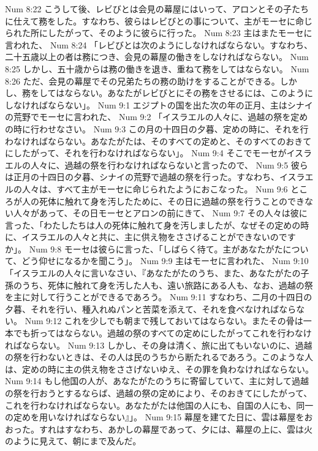 Num 8:22  こうして後、レビびとは会見の幕屋にはいって、アロンとその子たちに仕えて務をした。すなわち、彼らはレビびとの事について、主がモーセに命じられた所にしたがって、そのように彼らに行った。
Num 8:23  主はまたモーセに言われた、
Num 8:24  「レビびとは次のようにしなければならない。すなわち、二十五歳以上の者は務につき、会見の幕屋の働きをしなければならない。
Num 8:25  しかし、五十歳からは務の働きを退き、重ねて務をしてはならない。
Num 8:26  ただ、会見の幕屋でその兄弟たちの務の助けをすることができる。しかし、務をしてはならない。あなたがレビびとにその務をさせるには、このようにしなければならない」。
Num 9:1  エジプトの国を出た次の年の正月、主はシナイの荒野でモーセに言われた、
Num 9:2  「イスラエルの人々に、過越の祭を定めの時に行わせなさい。
Num 9:3  この月の十四日の夕暮、定めの時に、それを行わなければならない。あなたがたは、そのすべての定めと、そのすべてのおきてにしたがって、それを行わなければならない」。
Num 9:4  そこでモーセがイスラエルの人々に、過越の祭を行わなければならないと言ったので、
Num 9:5  彼らは正月の十四日の夕暮、シナイの荒野で過越の祭を行った。すなわち、イスラエルの人々は、すべて主がモーセに命じられたようにおこなった。
Num 9:6  ところが人の死体に触れて身を汚したために、その日に過越の祭を行うことのできない人々があって、その日モーセとアロンの前にきて、
Num 9:7  その人々は彼に言った、「わたしたちは人の死体に触れて身を汚しましたが、なぜその定めの時に、イスラエルの人々と共に、主に供え物をささげることができないのですか」。
Num 9:8  モーセは彼らに言った、「しばらく待て。主があなたがたについて、どう仰せになるかを聞こう」。
Num 9:9  主はモーセに言われた、
Num 9:10  「イスラエルの人々に言いなさい、『あなたがたのうち、また、あなたがたの子孫のうち、死体に触れて身を汚した人も、遠い旅路にある人も、なお、過越の祭を主に対して行うことができるであろう。
Num 9:11  すなわち、二月の十四日の夕暮、それを行い、種入れぬパンと苦菜を添えて、それを食べなければならない。
Num 9:12  これを少しでも朝まで残しておいてはならない。またその骨は一本でも折ってはならない。過越の祭のすべての定めにしたがってこれを行わなければならない。
Num 9:13  しかし、その身は清く、旅に出てもいないのに、過越の祭を行わないときは、その人は民のうちから断たれるであろう。このような人は、定めの時に主の供え物をささげないゆえ、その罪を負わなければならない。
Num 9:14  もし他国の人が、あなたがたのうちに寄留していて、主に対して過越の祭を行おうとするならば、過越の祭の定めにより、そのおきてにしたがって、これを行わなければならない。あなたがたは他国の人にも、自国の人にも、同一の定めを用いなければならない』」。
Num 9:15  幕屋を建てた日に、雲は幕屋をおおった。すれはすなわち、あかしの幕屋であって、夕には、幕屋の上に、雲は火のように見えて、朝にまで及んだ。
